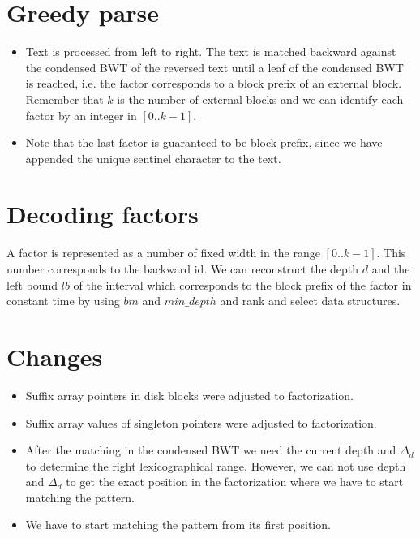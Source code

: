 \documentclass{article}
\begin{document}
\section{Greedy parse}

\begin{itemize}
	\item Text is processed from left to right. The
	      text is matched backward against the condensed BWT
		  of the reversed text until a leaf of the
		  condensed BWT is reached, i.e. the factor corresponds 
		  to a block prefix of an external block. Remember that $k$ is the
		  number of external blocks and we can identify
		  each factor by an integer in $[0..k-1]$. 
	\item Note that the last factor is guaranteed to be block
	      prefix, since we have appended the unique sentinel character
		  to the text.	
\end{itemize}

\section{Decoding factors}
A factor is represented as a number of fixed width in the range
$[0..k-1]$. This number corresponds to the backward id. We can
reconstruct the depth $d$ and the left bound $lb$ of the interval
which corresponds to the block prefix of the factor in constant time
by using $bm$ and $min\_depth$ and rank and select data structures.

\section{Changes}

\begin{itemize}
	\item Suffix array pointers in disk blocks were adjusted to
	      factorization. 
	\item Suffix array values of singleton pointers were adjusted to
		  factorization.
	\item After the matching in the condensed BWT we need the current
	      depth and $\Delta_d$ to determine the right lexicographical
		  range. However, we can not use depth and $\Delta_d$ to get
		  the exact position in the factorization where we have to
		  start matching the pattern.
	\item We have to start matching the pattern from its first position.	
\end{itemize}
\end{document}
